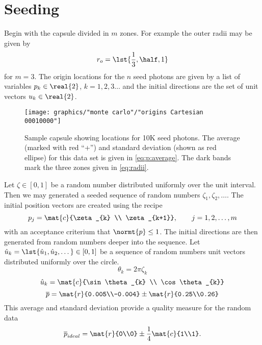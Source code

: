 \section{\label{sec:seeding}Seeding}

Begin with the capsule divided in $m$ zones. For example the outer radii may be given by
\begin{equation}
  r_{o} = \lst{\frac{1}{3},\half,1}
  \label{eq:radii}
\end{equation}
for $m=3$. The origin locations for the $n$ seed photons are given by a list of variables $p_{k}\in\real{2}$, $k=1,2,3\dots$ and the initial directions are the set of unit vectors $u_{k}\in\real{2}$.
\begin{figure}[bthp] 
   \centering
   \texttt{[image: graphics/"monte carlo"/"origins Cartesian 00010000"]} 
   \caption[Sample capsule with seed photons]{Sample capsule showing locations for 10K seed photons. The average (marked with red ``+'') and standard deviation (shown as red ellipse) for this data set is given in \eqref{eq:p:average}. The dark bands mark the three zones given in \eqref{eq:radii}.}
   \label{fig:capsule:seed}
\end{figure}
Let $\zeta\in[0,1]$ be a random number distributed uniformly over the unit interval. Then we may generated a seeded sequence of random numbers $\zeta_{1}, \zeta_{2}, \dots$. The initial position vectors are created using the recipe
\begin{equation}
  p_{j} = \mat{c}{\zeta_{k} \\ \zeta_{k+1}}, \qquad j=1,2,\dots,m
\end{equation}
with an acceptance criterium that $\normt{p}\le1$. The initial directions are then generated from random numbers deeper into the sequence.
Let $\hat{u}_{k}=\lst{\hat{u}_{1},\hat{u}_{2},\dots}\in[0,1]$ be a sequence of random numbers unit vectors distributed uniformly over the circle.
\begin{equation}
  \theta_{k} = 2 \pi \zeta_{k}
\end{equation}
\begin{equation}
  \hat{u}_{k} = \mat{c}{\sin \theta_{k} \\ \cos \theta_{k}}
\end{equation}
\begin{equation}
  \overline{p} = \mat{r}{0.005\\-0.004} \pm \mat{r}{0.25\\0.26}
  \label{eq:p:average}
\end{equation}
This average and standard deviation provide a quality measure for the random data
\begin{equation}
  \overline{p}_{ideal} = \mat{r}{0\\0} \pm \frac{1}{4} \mat{c}{1\\1}.
\end{equation}

%
%

\endinput %